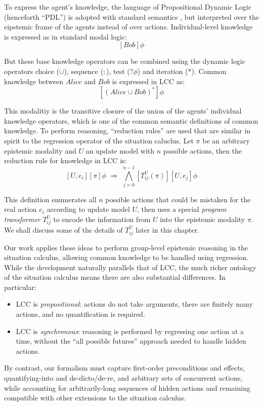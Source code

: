 To express the agent's knowledge, the language of Propositional Dynamic
Logic (henceforth {}``PDL'') is adopted with standard semantics
\citep{harel00dynamic_logic}, but interpreted over the eipstemic
frame of the agents instead of over actions. Individual-level knowledge
is expressed as in standard modal logic:\[
[Bob]\phi\]


But these base knowledge operators can be combined using the dynamic
logic operators choice ($\cup$), sequence ($;$), test ($?\phi$)
and iteration ($*$). Common knowledge between $Alice$ and $Bob$
is expressed in LCC as:\[
[(Alice\cup Bob)^{*}]\phi\]


This modalitiy is the transitive closure of the union of the agents'
individual knowledge operators, which is one of the common semantic
definitions of common knowledge. To perform reasoning, {}``reduction
rules'' are used that are similar in spirit to the regression operator
of the situation caluclus. Let $\pi$ be an arbitrary epistemic modality
and $U$ an update model with $n$ possible actions, then the reduction
rule for knowledge in LCC is:\[
[U,e_{i}][\pi]\phi\,\,\Rightarrow\,\,\bigwedge_{j=0}^{n-1}[T_{ij}^{U}(\pi)][U,e_{j}]\phi\]


This definition enumerates all $n$ possible actions that could be
mistaken for the real action $e_{i}$ according to update model $U$,
then uses a special \emph{program transformer} $T_{ij}^{U}$ to encode
the information from $U$ into the epistemic modality $\pi$. We shall
discuss some of the details of $T_{ij}^{U}$ later in this chapter.

Our work applies these ideas to perform group-level epistemic reasoning
in the situation calculus, allowing common knowledge to be handled
using regression. While the development naturally parallels that of
LCC, the much richer ontology of the situation calculus means there
are also substantial differences. In particular:

\begin{itemize}
\item LCC is \emph{propositional}: actions do not take arguments, there
are finitely many actions, and no quantification is required. 
\item LCC is \emph{synchronous}: reasoning is performed by regressing one
action at a time, without the {}``all possible futures'' approach
needed to handle hidden actions. 
\end{itemize}
By contrast, our formalism must capture first-order preconditions
and effects, quant\-ifying-into and de-dicto/de-re, and arbitrary
sets of concurrent actions, while accounting for arbitrarily-long
sequences of hidden actions and remaining compatible with other extensions
to the situation calculus.

